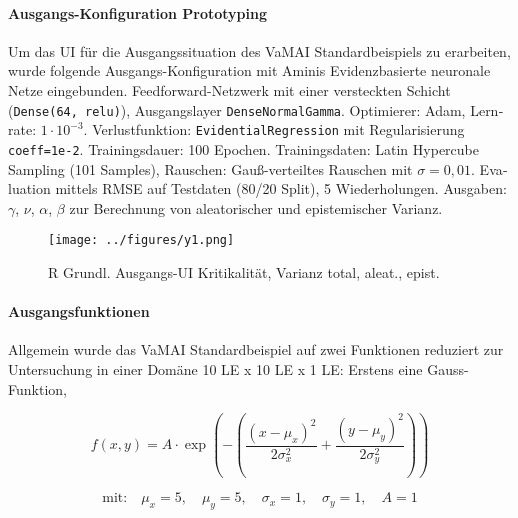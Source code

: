 \begin{otherlanguage}{ngerman}


\paragraph{Ausgangs-Konfiguration \glqq Prototyping \grqq} Um das UI für die Ausgangssituation des VaMAI Standardbeispiels zu erarbeiten, wurde folgende Ausgangs-Konfiguration mit Aminis \gls{Evidenzbasierte neuronale Netze} eingebunden. Feedforward-Netzwerk mit einer versteckten Schicht (\texttt{Dense(64, relu)}), Ausgangslayer \texttt{DenseNormalGamma}. Optimierer: Adam, Lernrate: $1\cdot10^{-3}$. Verlustfunktion: \texttt{EvidentialRegression} mit Regularisierung \texttt{coeff=1e-2}. Trainingsdauer: 100 Epochen. Trainingsdaten: Latin Hypercube Sampling (101 Samples), Rauschen: Gauß-verteiltes Rauschen mit $\sigma = 0{,}01$. Evaluation mittels RMSE auf Testdaten (80/20 Split), 5 Wiederholungen. Ausgaben: $\gamma$, $\nu$, $\alpha$, $\beta$ zur Berechnung von aleatorischer und epistemischer Varianz.

\begin{figure}[!ht]
  \centering
  \texttt{[image: ../figures/y1.png]}
  \caption{R Grundl. Ausgangs-UI Kritikalität, Varianz total, aleat., epist.}
\end{figure}

\paragraph{Ausgangsfunktionen} Allgemein wurde das VaMAI Standardbeispiel auf zwei Funktionen reduziert zur Untersuchung in einer Domäne 10 LE x 10 LE x 1 LE: Erstens eine Gauss-Funktion, 

\[
f(x, y) = A \cdot \exp\left( -\left( \frac{(x - \mu_x)^2}{2\sigma_x^2} + \frac{(y - \mu_y)^2}{2\sigma_y^2} \right) \right)
\]

\[
\text{mit:} \quad \mu_x = 5,\quad \mu_y = 5,\quad \sigma_x = 1,\quad \sigma_y = 1,\quad A = 1
\]


\end{otherlanguage}
